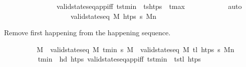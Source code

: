 \begin{isabellebody}
\ \ \ \ \ \ \ \ \ \ \ \ \ \ \ valid{\isacharunderscore}{\kern0pt}state{\isacharunderscore}{\kern0pt}seq{\isacharunderscore}{\kern0pt}app{\isacharunderscore}{\kern0pt}iff{\isacharbrackleft}{\kern0pt}\ tst\isactrlsub m\isactrlsub i\isactrlsub n{\isacharbrackright}{\kern0pt}{\isachardoublequoteclose}\ \ tshtps{\isacharprime}{\kern0pt}\ {\isacharat}{\kern0pt}\ {\isacharbrackleft}{\kern0pt}t\isactrlsub m\isactrlsub a\isactrlsub x{\isacharbrackright}{\kern0pt}{\isachardoublequoteclose}{\isacharbrackright}{\kern0pt}\isanewline
\ \ \ \ \ \ \ \ \ \ \isamarkupfalse%
\ auto\isanewline
\ \ \ \ \ \ \isamarkupfalse%
\isanewline
\ \ \ \ \isamarkupfalse%
\isanewline
\ \ \ \ \ \ \isamarkupfalse%
\ {\isachardoublequoteopen}valid{\isacharunderscore}{\kern0pt}state{\isacharunderscore}{\kern0pt}seq\ M\ htps\ {\isasympi}s\ M\isactrlsub n{\isachardoublequoteclose}%
\begin{isamarkuptext}%
Remove first happening from the happening sequence.%
\end{isamarkuptext}\isamarkuptrue%
\ \ \ \ \ \ \isamarkupfalse%
\ \isamarkupfalse%
\ M\ \ {\isachardoublequoteopen}valid{\isacharunderscore}{\kern0pt}state{\isacharunderscore}{\kern0pt}seq\ M\ {\isacharbrackleft}{\kern0pt}t\isactrlsub m\isactrlsub i\isactrlsub n{\isacharbrackright}{\kern0pt}\ {\isasympi}s\ M\ \ {\isachardoublequoteopen}valid{\isacharunderscore}{\kern0pt}state{\isacharunderscore}{\kern0pt}seq\ M\ {\isacharparenleft}{\kern0pt}tl\ htps{\isacharparenright}{\kern0pt}\ {\isasympi}s\ M\isactrlsub n{\isachardoublequoteclose}\isanewline
\ \ \ \ \ \ \ \ \isamarkupfalse%
\ {\isacartoucheopen}t\isactrlsub m\isactrlsub i\isactrlsub n\ {\isacharequal}{\kern0pt}\ hd\ htps{\isacartoucheclose}\ valid{\isacharunderscore}{\kern0pt}state{\isacharunderscore}{\kern0pt}seq{\isacharunderscore}{\kern0pt}app{\isacharunderscore}{\kern0pt}iff{\isacharbrackleft}{\kern0pt}\ tst\isactrlsub m\isactrlsub i\isactrlsub n{\isacharbrackright}{\kern0pt}{\isachardoublequoteclose}\ \ tstl\ htps{\isachardoublequoteclose}{\isacharbrackright}{\kern0pt}\isanewline

\end{isabellebody}
